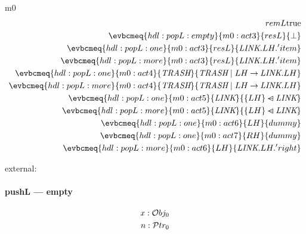 \documentclass[12pt]{amsart}
\newcommand{\OBJ}{\mathcal{O}bj}
\newcommand{\Addr}{\mathcal{P}tr}
\newcommand{\link}{\textit{LINK}}
\newcommand{\trash}{\textit{TRASH}}
\begin{document}
\begin{machine}{m0}
\begin{align*}
    {remL}{\true} \\
  \evbcmeq{hdl:popL:empty}{m0:act3}
    {resL}{\bot} \\
  \evbcmeq{hdl:popL:one}{m0:act3}
    {resL}{\link.LH.'item} \\
  \evbcmeq{hdl:popL:more}{m0:act3}
    {resL}{\link.LH.'item} \\
  \evbcmeq{hdl:popL:one}{m0:act4}
    {\trash}{\trash \1| LH \fun \link.LH} \\
  \evbcmeq{hdl:popL:more}{m0:act4}
    {\trash}{\trash \1| LH \fun \link.LH} \\
  \evbcmeq{hdl:popL:one}{m0:act5}
    {\link}{ \{LH\} \domsub \link } \\
  \evbcmeq{hdl:popL:more}{m0:act5}
    {\link}{ \{LH\} \domsub \link } \\
  \evbcmeq{hdl:popL:one}{m0:act6}
    {LH}{ dummy } \\
  \evbcmeq{hdl:popL:one}{m0:act7}
    {RH}{ dummy } \\
  \evbcmeq{hdl:popL:more}{m0:act6}
    {LH}{ \link.LH.'right } \\
\end{align*}

external:

\paragraph{pushL --- empty}

\begin{align*}
  \param{ext:pushL:empty}{x : \OBJ_0 } \\
  \param{ext:pushL:empty}{n : \Addr_0 } \\
\end{align*}


\end{machine}
\end{document}

